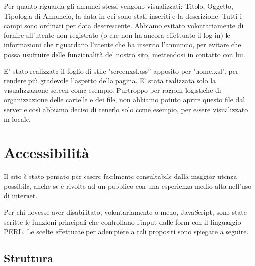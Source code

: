 \documentclass[12pt]{article}
\begin{document}
Per quanto riguarda gli annunci stessi vengono visualizzati: Titolo, Oggetto, Tipologia di Annuncio, la data in cui sono stati inseriti e la descrizione. Tutti i campi sono ordinati per data descrescente. Abbiamo evitato volontariamente di fornire all’utente non registrato (o che non ha ancora effettuato il log-in) le informazioni che riguardano l’utente che ha inserito l’annuncio, per evitare che possa usufruire delle funzionalità del nostro sito, mettendosi in contatto con lui.

E’ stato realizzato il foglio di stile "screen\textunderscore xsl.css” apposito per "home.xsl", per rendere più gradevole l’aspetto della pagina. E’ stata realizzata solo la visualizzazione screen come esempio. 
Purtroppo per ragioni logistiche di organizzazione delle cartelle e dei file, non abbiamo potuto aprire questo file dal server e così abbiamo deciso di tenerlo solo come esempio, per essere visualizzato in locale.


\section{Accessibilità}
Il sito è stato pensato per essere facilmente consultabile dalla maggior utenza possibile, anche se è rivolto ad un pubblico con una esperienza medio-alta nell’uso di internet.

Per chi dovesse aver disabilitato, volontariamente o meno, JavaScript, sono state scritte le funzioni principali che controllano l’input dalle form con il linguaggio PERL. Le scelte effettuate per adempiere a tali propositi sono spiegate a seguire.

	\subsection{Struttura}
	
\end{document}
